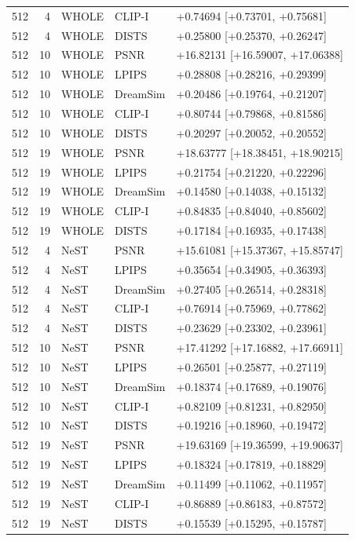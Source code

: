 \documentclass[10pt,letterpaper]{article}
\begin{document}
\begin{longtable}{@{}rrlll@{}}
512 & 4 & WHOLE & CLIP-I & +0.74694 [+0.73701, +0.75681]\\
512 & 4 & WHOLE & DISTS & +0.25800 [+0.25370, +0.26247]\\
512 & 10 & WHOLE & PSNR & +16.82131 [+16.59007, +17.06388]\\
512 & 10 & WHOLE & LPIPS & +0.28808 [+0.28216, +0.29399]\\
512 & 10 & WHOLE & DreamSim & +0.20486 [+0.19764, +0.21207]\\
512 & 10 & WHOLE & CLIP-I & +0.80744 [+0.79868, +0.81586]\\
512 & 10 & WHOLE & DISTS & +0.20297 [+0.20052, +0.20552]\\
512 & 19 & WHOLE & PSNR & +18.63777 [+18.38451, +18.90215]\\
512 & 19 & WHOLE & LPIPS & +0.21754 [+0.21220, +0.22296]\\
512 & 19 & WHOLE & DreamSim & +0.14580 [+0.14038, +0.15132]\\
512 & 19 & WHOLE & CLIP-I & +0.84835 [+0.84040, +0.85602]\\
512 & 19 & WHOLE & DISTS & +0.17184 [+0.16935, +0.17438]\\
512 & 4 & NeST & PSNR & +15.61081 [+15.37367, +15.85747]\\
512 & 4 & NeST & LPIPS & +0.35654 [+0.34905, +0.36393]\\
512 & 4 & NeST & DreamSim & +0.27405 [+0.26514, +0.28318]\\
512 & 4 & NeST & CLIP-I & +0.76914 [+0.75969, +0.77862]\\
512 & 4 & NeST & DISTS & +0.23629 [+0.23302, +0.23961]\\
512 & 10 & NeST & PSNR & +17.41292 [+17.16882, +17.66911]\\
512 & 10 & NeST & LPIPS & +0.26501 [+0.25877, +0.27119]\\
512 & 10 & NeST & DreamSim & +0.18374 [+0.17689, +0.19076]\\
512 & 10 & NeST & CLIP-I & +0.82109 [+0.81231, +0.82950]\\
512 & 10 & NeST & DISTS & +0.19216 [+0.18960, +0.19472]\\
512 & 19 & NeST & PSNR & +19.63169 [+19.36599, +19.90637]\\
512 & 19 & NeST & LPIPS & +0.18324 [+0.17819, +0.18829]\\
512 & 19 & NeST & DreamSim & +0.11499 [+0.11062, +0.11957]\\
512 & 19 & NeST & CLIP-I & +0.86889 [+0.86183, +0.87572]\\
512 & 19 & NeST & DISTS & +0.15539 [+0.15295, +0.15787]\\

\end{longtable}
\end{document}
